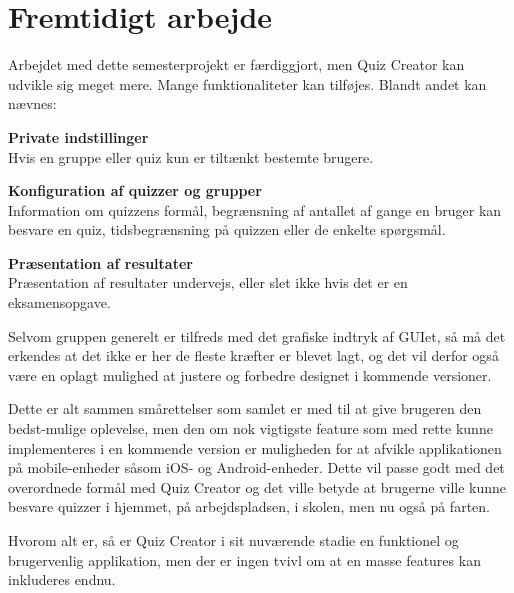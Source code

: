 \section{Fremtidigt arbejde}

Arbejdet med dette semesterprojekt er færdiggjort, men Quiz Creator kan udvikle sig meget mere. Mange funktionaliteter kan tilføjes. Blandt andet kan nævnes:

\textbf{Private indstillinger}\\
Hvis en gruppe eller quiz kun er tiltænkt bestemte brugere.

\textbf{Konfiguration af quizzer og grupper}\\
Information om quizzens formål, begrænsning af antallet af gange en bruger kan besvare en quiz, tidsbegrænsning på quizzen eller de enkelte spørgsmål.

\textbf{Præsentation af resultater}\\
Præsentation af resultater undervejs, eller slet ikke hvis det er en eksamensopgave.

Selvom gruppen generelt er tilfreds med det grafiske indtryk af GUIet, så må det erkendes at det ikke er her de fleste kræfter er blevet lagt, og det vil derfor også være en oplagt mulighed at justere og forbedre designet i kommende versioner.

Dette er alt sammen smårettelser som samlet er med til at give brugeren den bedst-mulige oplevelse, men den om nok vigtigste feature som med rette kunne implementeres i en kommende version er muligheden for at afvikle applikationen på mobile-enheder såsom iOS- og Android-enheder. Dette vil passe godt med det overordnede formål med Quiz Creator og det ville betyde at brugerne ville kunne besvare quizzer i hjemmet, på arbejdspladsen, i skolen, men nu også på farten.

Hvorom alt er, så er Quiz Creator i sit nuværende stadie en funktionel og brugervenlig applikation, men der er ingen tvivl om at en masse features kan inkluderes endnu.